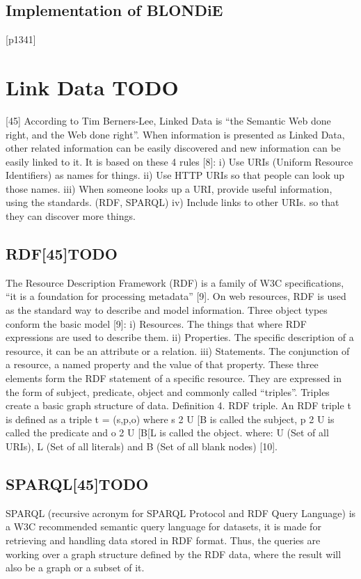 \subsection{Implementation of BLONDiE}[p1341]
			
 \section{Link Data TODO}[45]
 According to Tim Berners-Lee, Linked Data is “the Semantic
 Web done right, and the Web done right”. When information
 is presented as Linked Data, other related information can
 be easily discovered and new information can be easily linked
 to it. It is based on these 4 rules [8]:
 i) Use URIs (Uniform Resource Identifiers) as names for
 things.
 ii) Use HTTP URIs so that people can look up those names.
 iii) When someone looks up a URI, provide useful information,
 using the standards. (RDF, SPARQL)
 iv) Include links to other URIs. so that they can discover
 more things.
 \subsection{RDF[45]TODO}
 The Resource Description Framework (RDF) is a family
 of W3C specifications, “it is a foundation for processing
 metadata” [9]. On web resources, RDF is used as the standard
 way to describe and model information. Three object types
 conform the basic model [9]:
 i) Resources. The things that where RDF expressions are
 used to describe them.
 ii) Properties. The specific description of a resource, it can
 be an attribute or a relation.
 iii) Statements. The conjunction of a resource, a named
 property and the value of that property. These three
 elements form the RDF statement of a specific resource.
 They are expressed in the form of subject, predicate,
 object and commonly called “triples”. Triples create a
 basic graph structure of data.
 Definition 4. RDF triple. An RDF triple t is defined as a
 triple t = (s,p,o) where s 2 U [B is called the subject, p 2 U
 is called the predicate and o 2 U [B[L is called the object.
 where: U (Set of all URIs), L (Set of all literals) and B (Set
 of all blank nodes) [10].
 
 \subsection{SPARQL[45]TODO}
 SPARQL (recursive acronym for SPARQL Protocol and
 RDF Query Language) is a W3C recommended semantic
 query language for datasets, it is made for retrieving and
 handling data stored in RDF format. Thus, the queries are
 working over a graph structure defined by the RDF data, where
 the result will also be a graph or a subset of it.
